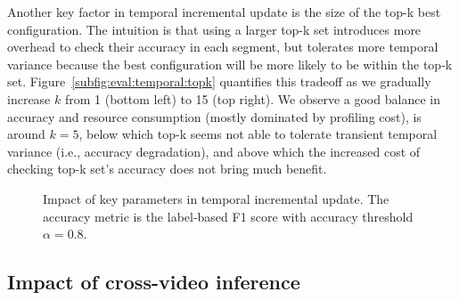 Another key factor in temporal incremental update is the size of the top-k best configuration. The intuition is that using a larger top-k set introduces more overhead to check their accuracy in each segment, but tolerates more temporal variance because the best configuration will be more likely to be within the top-k set.
Figure~\ref{subfig:eval:temporal:topk} quantifies this tradeoff as we gradually increase $k$ from 1 (bottom left) to 15 (top right). We observe a good balance in accuracy and resource consumption (mostly dominated by profiling cost), is around $k=5$, below which top-k seems not able to tolerate transient temporal variance (i.e., accuracy degradation), and above which the increased cost of checking top-k set's accuracy does not bring much benefit.

\begin{figure}[t!]
    \centering
    \hspace{-0.5cm}
    \caption{Impact of key parameters in temporal incremental update. The accuracy metric is the label-based F1 score with accuracy threshold $\alpha=0.8$.}
    \label{fig:eval:temporal}
\end{figure}


\subsection{Impact of cross-video inference}
\label{sec:eval:spatial}

